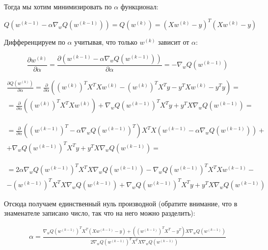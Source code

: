 \documentclass{article}
\begin{document}
\begin{enumerate}
    Тогда мы хотим минимизировать по \( \alpha \) функционал:

    \small
    \begin{equation*}
        Q(w^{(k - 1)} - \alpha \nabla_w Q(w^{(k - 1)})) = Q(w^{(k)}) = (X w^{(k)} - y)^T (X w^{(k)} - y)
    \end{equation*}
    \normalsize

    Дифференцируем по \( \alpha \) учитывая, что только \( w^{(k)} \) зависит от \( \alpha \):

    \small
    \begin{equation*}
        \frac{\partial w^{(k)}}{\partial \alpha} = \frac{\partial \left( w^{(k - 1)} - \alpha \nabla_w Q(w^{(k - 1)}) \right)}{\partial \alpha} =
        - \nabla_w Q(w^{(k - 1)})
    \end{equation*}

    \begin{gather*}
        \frac{\partial Q(w^{(k)})}{\partial \alpha} = 
        \frac{\partial}{\partial \alpha} \left( {(w^{(k)})}^T X^T X w^{(k)} - {(w^{(k)})}^T X^T y - y^T X w^{(k)} - y^T y \right) = \\
        = \frac{\partial}{\partial \alpha} \left( {(w^{(k)})}^T X^T X w^{(k)} \right) +
        {\nabla_w Q(w^{(k - 1)})}^T X^T y + y^T X \nabla_w Q(w^{(k - 1)}) = 
    \end{gather*}

    \begin{gather*}
        = \frac{\partial}{\partial \alpha} \left( {(w^{(k - 1)})}^T - \alpha {\nabla_w Q(w^{(k - 1)})}^T \right)
        X^T X \left( w^{(k - 1)} - \alpha \nabla_w Q(w^{(k - 1)}) \right) + \\
        + {\nabla_w Q(w^{(k - 1)})}^T X^T y + y^T X \nabla_w Q(w^{(k - 1)}) = 
    \end{gather*}

    \begin{gather*}
        = 2 \alpha {\nabla_w Q(w^{(k - 1)})}^T X^T X \nabla_w Q(w^{(k - 1)}) -
        {\nabla_w Q(w^{(k - 1)})}^T X^T X w^{(k - 1)} - \\
        - {(w^{(k - 1)})}^T X^T X \nabla_w Q(w^{(k - 1)}) + {\nabla_w Q(w^{(k - 1)})}^T X^T y + y^T X \nabla_w Q(w^{(k - 1)})
    \end{gather*}
    \normalsize

    Отсюда получаем единственный нуль производной (обратите внимание, что в знаменателе записано число, так что на него можно разделить):

    \small
    \begin{gather*}
        \alpha = \frac{{\nabla_w Q(w^{(k - 1)})}^T X^T (X w^{(k - 1)} - y) + ({(w^{(k - 1)})}^T X^T - y^T)X \nabla_w Q(w^{(k - 1)})}
        {2 {\nabla_w Q(w^{(k - 1)})}^T X^T X \nabla_w Q(w^{(k - 1)})}
    \end{gather*}


\end{enumerate}
\end{document}
